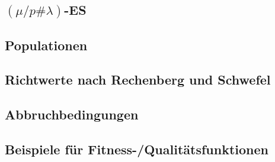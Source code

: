\subsection{$(\mu / p \# \lambda)$-ES}



\subsection{Populationen}



\subsection{Richtwerte nach Rechenberg und Schwefel}



\subsection{Abbruchbedingungen}



\subsection{Beispiele für Fitness-/Qualitätsfunktionen}


